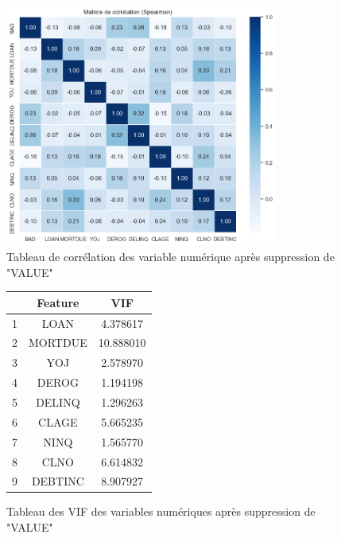 \documentclass[a4paper,12pt]{report}
\begin{document}
\begin{figure}[h!]
  \begin{center}
    \includegraphics[width=0.8\textwidth]{../images/tab_corr_num_num_after_1st_drop}
  \end{center}
  \caption{Tableau de corrélation des variable numérique après suppression de "VALUE"}
  \label{fig:tab_corr_num_num_after_1st_drop}
\end{figure}

\begin{figure}[h!]
  \begin{center}
    \begin{tabular}{||c c c||} 
     \hline
      & Feature & VIF \\ [0.5ex] 
     \hline\hline
     1 & LOAN & 4.378617 \\ 
     \hline
     2 & MORTDUE & 10.888010 \\
     \hline
     3 & YOJ & 2.578970 \\
     \hline
     4 & DEROG & 1.194198 \\
     \hline
     5 & DELINQ & 1.296263 \\
     \hline
     6 & CLAGE & 5.665235 \\
     \hline
     7 & NINQ & 1.565770 \\
     \hline
     8 & CLNO & 6.614832 \\
     \hline
     9 & DEBTINC & 8.907927 \\ [1ex] 
     \hline
    \end{tabular}
  \end{center}
  \caption{Tableau des VIF des variables numériques après suppression de "VALUE"}
  \label{fig:tab_vif_num_num_after_1st_drop}
\end{figure}
\end{document}
